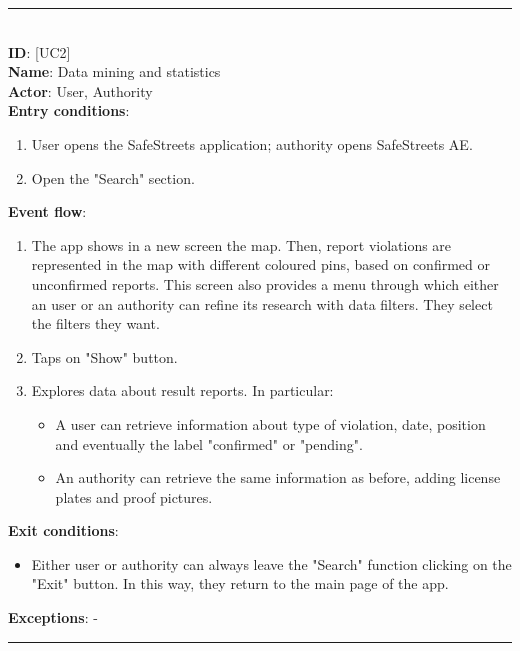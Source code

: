 \documentclass{article}
\newcommand\usecase[1]{ [UC#1] }
\begin{document}
				\rule{\linewidth}{0.4pt}
				\\
				
				\textbf{ID}: \usecase{2} \\
				\textbf{Name}:   Data mining and statistics\\
				\textbf{Actor}:  User, Authority\\
				\textbf{Entry conditions}:
				\begin{enumerate}
					\item User opens the SafeStreets application; authority opens SafeStreets AE.
					\item Open the "Search" section.
				\end{enumerate}
				\textbf{Event flow}:
				\begin{enumerate}
					\item The app shows in a new screen the map. Then, report violations are represented in the map with different coloured pins, based on confirmed or unconfirmed reports. This screen also provides a menu through which either an user or an authority can refine its research with data filters.
					They select the filters they want.
					\item Taps on "Show" button.
					\item Explores data about result reports. In particular:
					\begin{itemize}
						\item A user can retrieve information about type of violation, date, position and eventually the label "confirmed" or "pending".
						\item An authority can retrieve the same information as before, adding license plates and proof pictures.
					\end{itemize}
				\end{enumerate}
				\textbf{Exit conditions}:
				\begin{itemize}
					\item Either user or authority can always leave the "Search" function clicking on the "Exit" button. In this way, they return to the main page of the app.
				\end{itemize}
				\textbf{Exceptions}: -\\
				
				\rule{\linewidth}{0.4pt}
				\\
					
\end{document}

